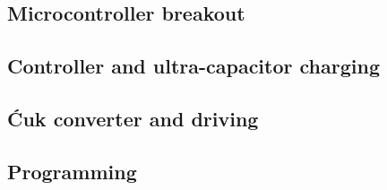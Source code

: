 \subsection{Microcontroller breakout}

\subsection{Controller and ultra-capacitor charging}

\subsection{\'Cuk converter and driving}

\subsection{Programming}

